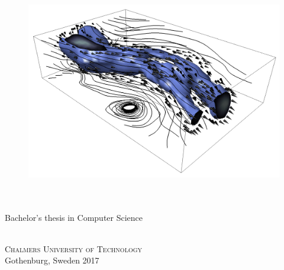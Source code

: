
\begin{titlepage}
			
\addtolength{\voffset}{2cm}

\begin{figure}[H]
\centering
\vspace{2cm}	%
\includegraphics[width=0.9\linewidth]{figure/Wind.png}
\end{figure}

\mbox{}
\vfill
\renewcommand{\familydefault}{\sfdefault} \normalfont %
\textbf{{\Huge 	\varHeadline}} 	\\[0.5cm]
{\Large \varSubtitle}\\[0.5cm] Bachelor's thesis in Computer Science \setlength{\parskip}{1cm}

{\Large \varNames} \setlength{\parskip}{2.9cm}

\varDepartment \\
\textsc{Chalmers University of Technology} \\
Gothenburg, Sweden 2017

\renewcommand{\familydefault}{\rmdefault} \normalfont %
\end{titlepage}


\newpage
\restoregeometry
\thispagestyle{empty}
\mbox{}


